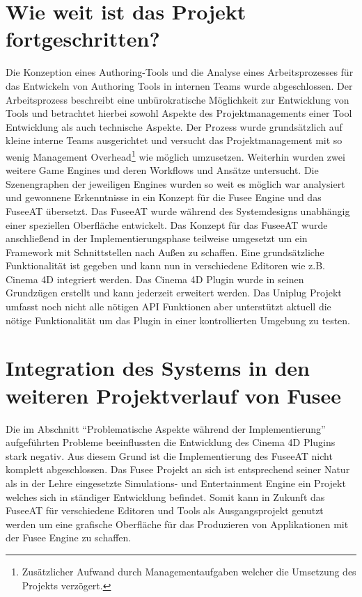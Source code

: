 \documentclass[pagesize, paper=a4, fontsize=12pt, titlepage=true, headings=small, headnosepline, abstractoff, liststotoc, nochapterprefix, plainheadsepline, twoside]{scrreprt}
\begin{document}
\section{Wie weit ist das Projekt fortgeschritten?}
Die Konzeption eines Authoring-Tools und die Analyse eines Arbeitsprozesses für das Entwickeln von Authoring Tools in internen Teams wurde abgeschlossen. Der Arbeitsprozess beschreibt eine unbürokratische Möglichkeit zur Entwicklung von Tools und betrachtet hierbei sowohl Aspekte des Projektmanagements einer Tool Entwicklung als auch technische Aspekte. Der Prozess wurde grundsätzlich auf kleine interne Teams ausgerichtet und versucht das Projektmanagement mit so wenig Management Overhead\footnote{Zusätzlicher Aufwand durch Managementaufgaben welcher die Umsetzung des Projekts verzögert.} wie möglich umzusetzen. Weiterhin wurden zwei weitere Game Engines und deren Workflows und Ansätze untersucht. Die Szenengraphen der jeweiligen Engines wurden so weit es möglich war analysiert und gewonnene Erkenntnisse in ein Konzept für die Fusee Engine und das FuseeAT übersetzt. Das FuseeAT wurde während des Systemdesigns unabhängig einer speziellen Oberfläche entwickelt. Das Konzept für das FuseeAT wurde anschließend in der Implementierungsphase teilweise umgesetzt um ein Framework mit Schnittstellen nach Außen zu schaffen. Eine grundsätzliche Funktionalität ist gegeben und kann nun in verschiedene Editoren wie z.B. Cinema 4D integriert werden. Das Cinema 4D Plugin wurde in seinen Grundzügen erstellt und kann jederzeit erweitert werden. Das Uniplug Projekt umfasst noch nicht alle nötigen API Funktionen aber unterstützt aktuell die nötige Funktionalität um das Plugin in einer kontrollierten Umgebung zu testen.

\section{Integration des Systems in den weiteren Projektverlauf von Fusee}
Die im Abschnitt “Problematische Aspekte während der Implementierung” aufgeführten Probleme beeinflussten die Entwicklung des Cinema 4D Plugins stark negativ. Aus diesem Grund ist die Implementierung des FuseeAT nicht komplett abgeschlossen. Das Fusee Projekt an sich ist entsprechend seiner Natur als in der Lehre eingesetzte Simulations- und Entertainment Engine ein Projekt welches sich in ständiger Entwicklung befindet. Somit kann in Zukunft das FuseeAT für verschiedene Editoren und Tools als Ausgangsprojekt genutzt werden um eine grafische Oberfläche für das Produzieren von Applikationen mit der Fusee Engine zu schaffen.  
\end{document}
